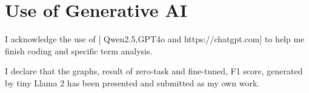 \documentclass[11pt]{article}
\begin{document}
 
    





\pagebreak






\section*{Use of Generative AI}
I acknowledge the use of [ Qwen2.5,GPT4o and https://chatgpt.com] to help me finish coding and specific term analysis.\cite{touvron2023llama}

I declare that the graphs, result of zero-task and fine-tuned, F1 score,  generated by tiny Llama 2 has been presented and submitted as my own work.



%


\appendix
\end{document}
